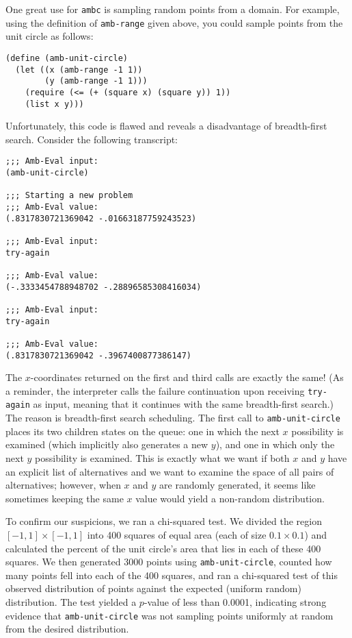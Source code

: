 \documentclass{article}
\begin{document}
One great use for \texttt{ambc} is sampling random points from a domain. For
example, using the definition of \texttt{amb-range} given above, you could
sample points from the unit circle as follows:
\begin{lstlisting}
(define (amb-unit-circle)
  (let ((x (amb-range -1 1))
        (y (amb-range -1 1)))
    (require (<= (+ (square x) (square y)) 1))
    (list x y)))
\end{lstlisting}

Unfortunately, this code is flawed and reveals a disadvantage of
breadth-first search. Consider the following transcript:
\begin{lstlisting}
;;; Amb-Eval input:
(amb-unit-circle)

;;; Starting a new problem
;;; Amb-Eval value:
(.8317830721369042 -.01663187759243523)

;;; Amb-Eval input:
try-again

;;; Amb-Eval value:
(-.3333454788948702 -.28896585308416034)

;;; Amb-Eval input:
try-again

;;; Amb-Eval value:
(.8317830721369042 -.3967400877386147)
\end{lstlisting}

The $x$-coordinates returned on the first and third calls are exactly the same!
(As a reminder, the interpreter calls the failure continuation upon receiving
\texttt{try-again} as input, meaning that it continues with the same
breadth-first search.) The reason is breadth-first search scheduling. The first
call to \texttt{amb-unit-circle} places its two children states on the queue:
one in which the next $x$ possibility is examined (which implicitly also
generates a new $y$), and one in which only the next $y$ possibility is
examined. This is exactly what we want if both $x$ and $y$ have an explicit
list of alternatives and we want to examine the space of all pairs of
alternatives; however, when $x$ and $y$ are randomly generated, it seems like
sometimes keeping the same $x$ value would yield a non-random distribution.

To confirm our suspicions, we ran a chi-squared test. We divided the region
$[-1,1]\times[-1,1]$ into 400 squares of equal area (each of size $0.1\times
0.1$) and calculated the percent of the unit circle's area that lies in each of
these 400 squares. We then generated 3000 points using
\texttt{amb-unit-circle}, counted how many points fell into each of the 400
squares, and ran a chi-squared test of this observed distribution of points
against the expected (uniform random) distribution. The test yielded a
$p$-value of less than 0.0001, indicating strong evidence that
\texttt{amb-unit-circle} was not sampling points uniformly at random from the
desired distribution.
\end{document}
